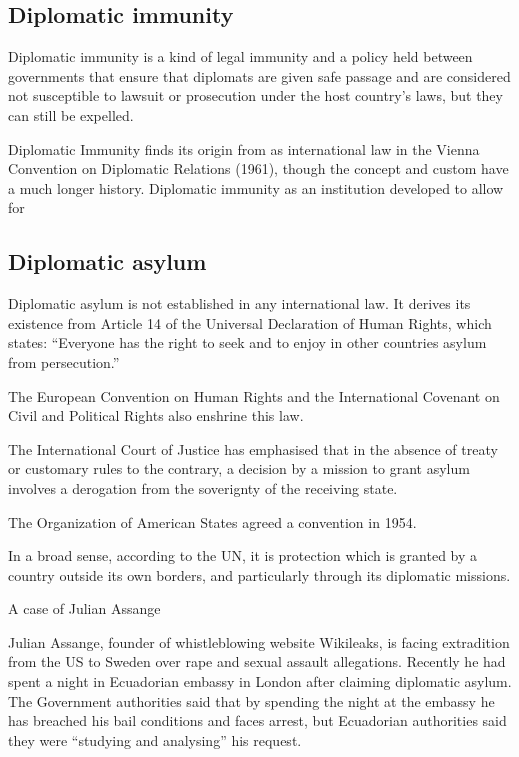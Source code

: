 \documentclass[
  openany]{book}
\begin{document}
\hypertarget{diplomatic-immunity}{%
\subsection{Diplomatic immunity}\label{diplomatic-immunity}}

Diplomatic immunity is a kind of legal immunity and a policy held between governments that ensure that diplomats are given safe passage and are considered not susceptible to lawsuit or prosecution under the host country's laws, but they can still be expelled.

Diplomatic Immunity finds its origin from as international law in the Vienna Convention on Diplomatic Relations (1961), though the concept and custom have a much longer history. Diplomatic immunity as an institution developed to allow for

\hypertarget{diplomatic-asylum}{%
\subsection{Diplomatic asylum}\label{diplomatic-asylum}}

Diplomatic asylum is not established in any international law. It derives its existence from Article 14 of the Universal Declaration of Human Rights, which states: ``Everyone has the right to seek and to enjoy in other countries asylum from persecution.''

The European Convention on Human Rights and the International Covenant on Civil and Political Rights also enshrine this law.

The International Court of Justice has emphasised that in the absence of treaty or customary rules to the contrary, a decision by a mission to grant asylum involves a derogation from the soverignty of the receiving state.

The Organization of American States agreed a convention in 1954.

In a broad sense, according to the UN, it is protection which is granted by a country outside its own borders, and particularly through its diplomatic missions.

A case of Julian Assange

Julian Assange, founder of whistleblowing website Wikileaks, is facing extradition from the US to Sweden over rape and sexual assault allegations. Recently he had spent a night in Ecuadorian embassy in London after claiming diplomatic asylum. The Government authorities said that by spending the night at the embassy he has breached his bail conditions and faces arrest, but Ecuadorian authorities said they were ``studying and analysing'' his request.
\end{document}
